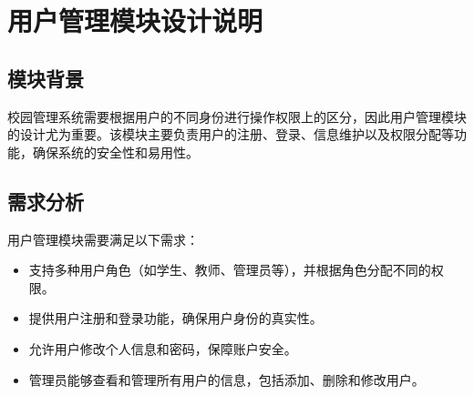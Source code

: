 \ifx\maindoc\undefined
{}
\fi

\section{用户管理模块设计说明}
\subsection{模块背景}
校园管理系统需要根据用户的不同身份进行操作权限上的区分，因此用户管理模块的设计尤为重要。该模块主要负责用户的注册、登录、信息维护以及权限分配等功能，确保系统的安全性和易用性。
\subsection{需求分析}
用户管理模块需要满足以下需求：
\begin{itemize}
    \item 支持多种用户角色（如学生、教师、管理员等），并根据角色分配不同的权限。
    \item 提供用户注册和登录功能，确保用户身份的真实性。
    \item 允许用户修改个人信息和密码，保障账户安全。
    \item 管理员能够查看和管理所有用户的信息，包括添加、删除和修改用户。
\end{itemize}
